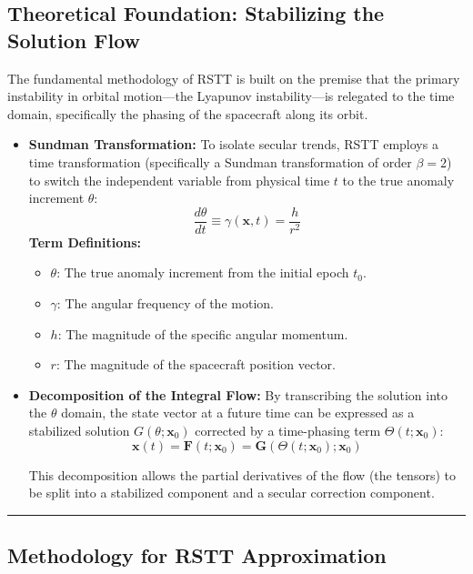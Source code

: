 \documentclass[
  letterpaper,
  DIV=11,
  numbers=noendperiod,
  oneside]{scrartcl}
\providecommand{\tightlist}{%
  \setlength{\itemsep}{0pt}\setlength{\parskip}{0pt}}
\begin{document}
\subsection{Theoretical Foundation: Stabilizing the Solution
Flow}\label{theoretical-foundation-stabilizing-the-solution-flow}

The fundamental methodology of RSTT is built on the premise that the
primary instability in orbital motion---the Lyapunov instability---is
relegated to the time domain, specifically the phasing of the spacecraft
along its orbit.

\begin{itemize}
\item
  \textbf{Sundman Transformation:} To isolate secular trends, RSTT
  employs a time transformation (specifically a Sundman transformation
  of order \(\beta=2\)) to switch the independent variable from physical
  time \(t\) to the true anomaly increment \(\theta\):
  \[\frac{d\theta}{dt} \equiv \gamma(\mathbf{x}, t) = \frac{h}{r^2}\]
  \textbf{Term Definitions:}

  \begin{itemize}
  \tightlist
  \item
    \(\theta\): The true anomaly increment from the initial epoch
    \(t_0\).
  \item
    \(\gamma\): The angular frequency of the motion.
  \item
    \(h\): The magnitude of the specific angular momentum.
  \item
    \(r\): The magnitude of the spacecraft position vector.
  \end{itemize}
\item
  \textbf{Decomposition of the Integral Flow:} By transcribing the
  solution into the \(\theta\) domain, the state vector at a future time
  can be expressed as a stabilized solution \(G(\theta; \mathbf{x}_0)\)
  corrected by a time-phasing term \(\Theta(t; \mathbf{x}_0)\): \[
  \mathbf{x}(t) = \mathbf{F}(t; \mathbf{x}_0) = \mathbf{G}(\Theta(t; \mathbf{x}_0); \mathbf{x}_0)
  \]

  This decomposition allows the partial derivatives of the flow (the
  tensors) to be split into a stabilized component and a secular
  correction component.
\end{itemize}

\begin{center}\rule{0.5\linewidth}{0.5pt}\end{center}

\subsection{Methodology for RSTT
Approximation}\label{methodology-for-rstt-approximation}
\end{document}
